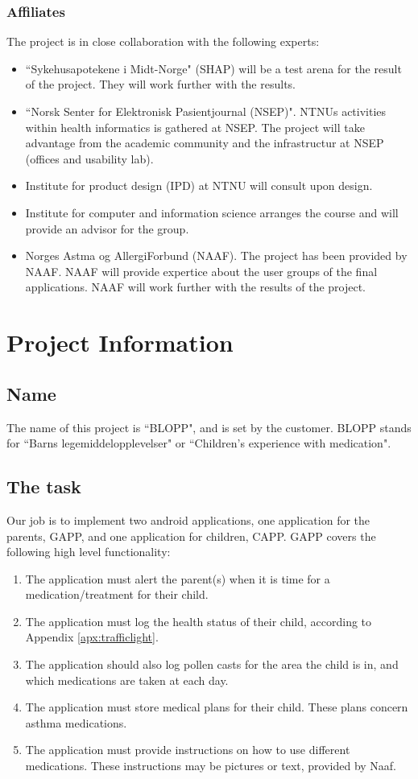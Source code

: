 \subsubsection{Affiliates}
The project is in close collaboration with the following experts:
\begin{itemize}
  	\item ``Sykehusapotekene i Midt-Norge" (SHAP) will be a test arena for the result of the project. They will work further with the results.
	\item ``Norsk Senter for Elektronisk Pasientjournal (NSEP)". NTNUs activities within health informatics is gathered at NSEP. The project will take advantage from 
the academic community and the infrastructur at NSEP (offices and usability lab).
	\item Institute for product design (IPD) at NTNU will consult upon design. 
	\item Institute for computer and information science arranges the course and will provide an advisor for the group. 
	\item Norges Astma og AllergiForbund (NAAF). The project has been provided by NAAF. NAAF will provide expertice about the user groups of the final applications. NAAF will work further with the results of the project. 
\end{itemize}

\section{Project Information}
\label{prosec}
\subsection{Name}
The name of this project is ``BLOPP", and is set by the customer. BLOPP stands for ``Barns 
legemiddelopplevelser" or ``Children's experience with medication".  




\subsection{The task}
Our job is to implement two android applications, one application for the parents, GAPP, and one application for children, CAPP.
GAPP covers the following high level functionality:
\begin{enumerate}
  \item The application must alert the parent(s) when it is time for a medication/treatment for their child.
  \item The application must log the health status of their child, according to Appendix \ref{apx:trafficlight}.
  \item The application should also log pollen casts for the area the child is in, and which medications are taken at each day.
  \item The application must store medical plans for their child. These plans concern asthma medications.
  \item The application must provide instructions on how to use different medications. These instructions may be pictures or text, provided by Naaf. 
\end{enumerate}

